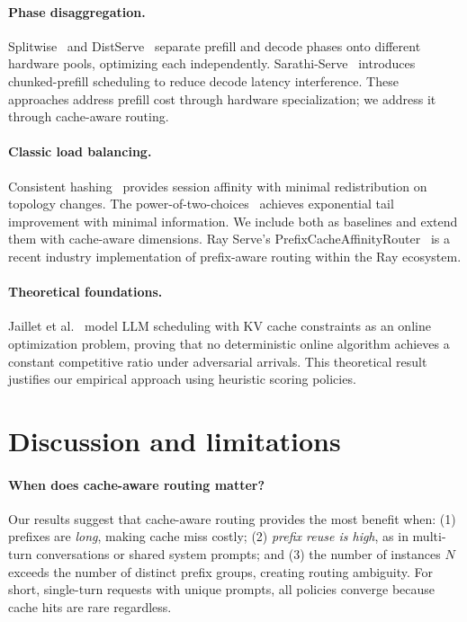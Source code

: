 \documentclass{article}
\begin{document}
\paragraph{Phase disaggregation.}
Splitwise~\citep{patel2024splitwise} and DistServe~\citep{zhong2024distserve} separate prefill and decode phases onto different hardware pools, optimizing each independently. Sarathi-Serve~\citep{agrawal2024sarathi} introduces chunked-prefill scheduling to reduce decode latency interference. These approaches address prefill cost through hardware specialization; we address it through cache-aware routing.

\paragraph{Classic load balancing.}
Consistent hashing~\citep{karger1997consistent} provides session affinity with minimal redistribution on topology changes. The power-of-two-choices~\citep{mitzenmacher2001power} achieves exponential tail improvement with minimal information. We include both as baselines and extend them with cache-aware dimensions. Ray Serve's PrefixCacheAffinityRouter~\citep{rayserve2024prefix} is a recent industry implementation of prefix-aware routing within the Ray ecosystem.

\paragraph{Theoretical foundations.}
Jaillet et al.~\citep{jaillet2026online_scheduling} model LLM scheduling with KV cache constraints as an online optimization problem, proving that no deterministic online algorithm achieves a constant competitive ratio under adversarial arrivals. This theoretical result justifies our empirical approach using heuristic scoring policies.

\section{Discussion and limitations}
\label{sec:discussion}

\paragraph{When does cache-aware routing matter?}
Our results suggest that cache-aware routing provides the most benefit when: (1) prefixes are \emph{long}, making cache miss costly; (2) \emph{prefix reuse is high}, as in multi-turn conversations or shared system prompts; and (3) the number of instances $N$ exceeds the number of distinct prefix groups, creating routing ambiguity. For short, single-turn requests with unique prompts, all policies converge because cache hits are rare regardless.
\end{document}
